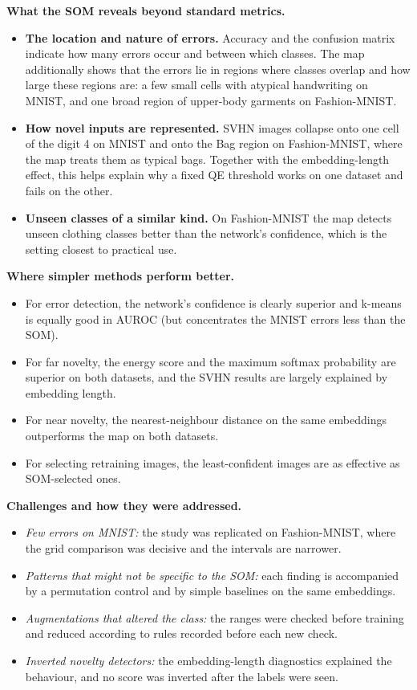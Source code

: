 \documentclass{scrartcl}
\begin{document}
\textbf{What the SOM reveals beyond standard metrics.}
\begin{itemize}
  \item \textbf{The location and nature of errors.} Accuracy and the confusion matrix indicate how many errors occur and between which classes. The map additionally shows that the errors lie in regions where classes overlap and how large these regions are: a few small cells with atypical handwriting on MNIST, and one broad region of upper-body garments on Fashion-MNIST.
  \item \textbf{How novel inputs are represented.} SVHN images collapse onto one cell of the digit 4 on MNIST and onto the Bag region on Fashion-MNIST, where the map treats them as typical bags. Together with the embedding-length effect, this helps explain why a fixed QE threshold works on one dataset and fails on the other.
  \item \textbf{Unseen classes of a similar kind.} On Fashion-MNIST the map detects unseen clothing classes better than the network's confidence, which is the setting closest to practical use.
\end{itemize}

\textbf{Where simpler methods perform better.}
\begin{itemize}
  \item For error detection, the network's confidence is clearly superior and k-means is equally good in AUROC (but concentrates the MNIST errors less than the SOM).
  \item For far novelty, the energy score and the maximum softmax probability are superior on both datasets, and the SVHN results are largely explained by embedding length.
  \item For near novelty, the nearest-neighbour distance on the same embeddings outperforms the map on both datasets.
  \item For selecting retraining images, the least-confident images are as effective as SOM-selected ones.
\end{itemize}

\textbf{Challenges and how they were addressed.}
\begin{itemize}
  \item \emph{Few errors on MNIST:} the study was replicated on Fashion-MNIST, where the grid comparison was decisive and the intervals are narrower.
  \item \emph{Patterns that might not be specific to the SOM:} each finding is accompanied by a permutation control and by simple baselines on the same embeddings.
  \item \emph{Augmentations that altered the class:} the ranges were checked before training and reduced according to rules recorded before each new check.
  \item \emph{Inverted novelty detectors:} the embedding-length diagnostics explained the behaviour, and no score was inverted after the labels were seen.
\end{itemize}
\end{document}
